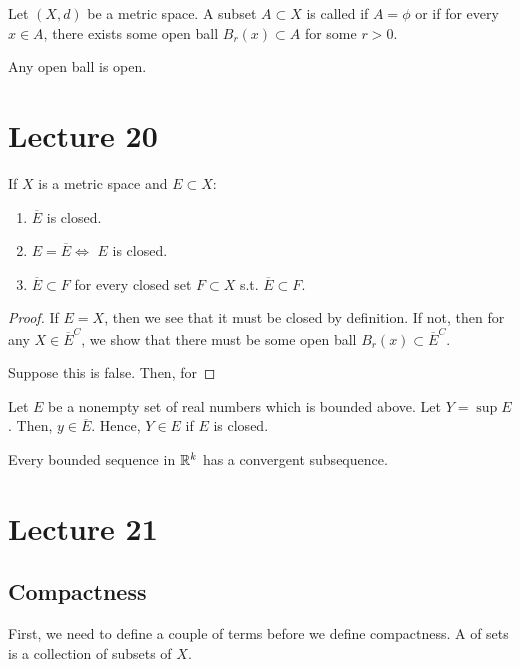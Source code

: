 \documentclass{book}
\begin{document}
\begin{defn}[Openness]
    Let $(X, d)$ be a metric space. A subset $A \subset X$ is called  if $A = \phi$ or if for every $x \in A$, there exists some open ball $B_r(x) \subset A$ for some $r > 0$.
\end{defn}

\begin{thm}
    Any open ball is open.
\end{thm}

\section{Lecture 20}
\begin{thm}
    If $X$ is a metric space and $E \subset X$:
    \begin{enumerate}
        \item $\overline E$ is closed.
        \item $E = \overline E \iff$ $E$ is closed.
        \item $\overline E \subset F$ for every closed set $F \subset X$ s.t. $\overline E \subset F$.
    \end{enumerate}
\end{thm}

\begin{proof}
    If $E = X$, then we see that it must be closed by definition. If not, then for any $X \in \overline{E}^C$, we show that there must be some open ball $B_r(x) \subset \overline{E}^C$. 

    Suppose this is false. Then, for 
\end{proof}

\begin{thm}
    Let $E$ be a nonempty set of real numbers which is bounded above. Let $Y = \sup E$. Then, $y \in \overline E$. Hence, $Y \in E$ if $E$ is closed.
\end{thm}

\begin{thm}
    Every bounded sequence in $\mathbb{R}^k$ has a convergent subsequence.
\end{thm}

\section{Lecture 21}
\subsection{Compactness}
First, we need to define a couple of terms before we define compactness. A  of sets is a collection of subsets of $X$. 
\end{document}
